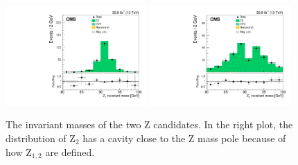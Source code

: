 \begin{figure}[!hb]
\centering
\includegraphics[width=0.48\textwidth]{figures/dibosons/zz4l/mZ1.pdf}
\includegraphics[width=0.48\textwidth]{figures/dibosons/zz4l/mZ2.pdf}
\caption{The invariant masses of the two Z candidates. 
In the right plot, the distribution of $\mathrm{Z}_{2}$ has a cavity close to the Z mass pole because of how $\mathrm{Z}_{1,2}$ are defined.
\label{fig:zz4l_mll}}
\end{figure}

